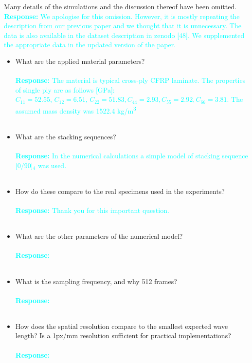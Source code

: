 \documentclass[11pt,a2paper]{report}
\begin{document}
	Many details of the simulations and the discussion thereof have been omitted. 
	\textcolor{Cyan}{
		\textbf{Response:}
	We apologise for this omission. However, it is mostly repeating the description from our previous paper and we thought that it is unnecessary. The data is also available in the dataset description in zenodo [48]. We supplemented the appropriate data in the updated version of the paper.}
	
	\begin{itemize}
		\item What are the applied material parameters?
			\\ \\
		\textcolor{Cyan}{
			\textbf{Response:}
		The material is typical cross-ply CFRP laminate. The properties of single ply are as follows [GPa]:
	    \(C_{11} = 52.55, \, C_{12} = 6.51, \, C_{22} = 51.83, C_{44} = 2.93, C_{55} = 2.92, C_{66} = 3.81\). The assumed mass density was 1522.4 kg/m\textsuperscript{3}}
		\\ \\
		\item What are the stacking sequences?
			\\ \\
		\textcolor{Cyan}{
			\textbf{Response:}
		In the numerical calculations a simple model of stacking sequence [0/90]\(_4\) was used.}
		\\ \\
		\item How do these compare to the real specimens used in the experiments?
			\\ \\
		\textcolor{Cyan}{
			\textbf{Response:}
		Thank you for this important question. }
		\\ \\
		\item What are the other parameters of the numerical model?
			\\ \\
		\textcolor{Cyan}{
			\textbf{Response:}}
		\\ \\
		\item What is the sampling frequency, and why 512 frames?
			\\ \\
		\textcolor{Cyan}{
			\textbf{Response:}}
		\\ \\
		\item How does the spatial resolution compare to the smallest expected wave length? Is a 1px/mm resolution sufficient for practical implementations?
			\\ \\
		\textcolor{Cyan}{
			\textbf{Response:}}
		\\ \\
	\end{itemize}
\end{document}
